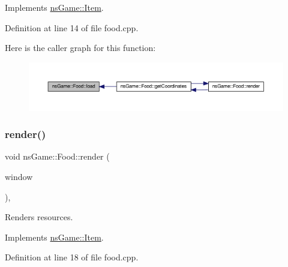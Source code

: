 Implements \hyperlink{structns_game_1_1_item_a5887b6e9225ae8a276801225eca83808}{ns\+Game\+::\+Item}.



Definition at line 14 of file food.\+cpp.

Here is the caller graph for this function\+:
\nopagebreak
\begin{figure}[H]
\begin{center}
\leavevmode
\includegraphics[width=350pt]{classns_game_1_1_food_a3d166bdb20aea5fe4ebf3c90b9c27e85_icgraph}
\end{center}
\end{figure}
\mbox{\label{classns_game_1_1_food_a503e4b78c3a07ec6dbc9cfe2c79742e0}} 
\subsubsection{\texorpdfstring{render()}{render()}}
{\footnotesize\ttfamily void ns\+Game\+::\+Food\+::render (\begin{DoxyParamCaption}\item[{Min\+GL \&}]{window }\end{DoxyParamCaption})\hspace{0.3cm}{\ttfamily [override]}, {\ttfamily [virtual]}}



Renders resources. 



Implements \hyperlink{structns_game_1_1_item_a451b6491efc475c9ca47dcccdbbde707}{ns\+Game\+::\+Item}.



Definition at line 18 of file food.\+cpp.

